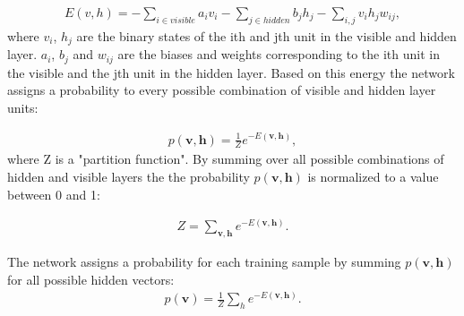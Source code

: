\begin{equation}
\begin{aligned}
    E(v,h) = -\sum_{i \in visible} a_{i}v_{i}-\sum_{j \in hidden} b_{j}h_{j}-\sum_{i,j} v_{i}h_{j}w_{ij},
\end{aligned}
\end{equation}
where $v_{i}$, $h_{j}$ are the binary states of the ith and jth unit in the visible and hidden layer. $a_{i}$, $b_{j}$ and $w_{ij}$ are the biases and weights corresponding to the ith unit in the visible and the jth unit in the hidden layer. Based on this energy the network assigns a probability to every possible combination of visible and hidden layer units:

\begin{equation}
\begin{aligned}
    p(\mathbf{v,h}) = \frac{1}{Z} e^{-E(\mathbf{v,h})},
\end{aligned}
\end{equation}
where Z is a "partition function". By summing over all possible combinations of hidden and visible layers the the probability $p(\mathbf{v,h})$ is normalized to a value between 0 and 1:

\begin{equation}
\begin{aligned}
    Z = \sum_{\mathbf{v,h}}e^{-E(\mathbf{v,h})}.
\end{aligned}
\end{equation}

The network assigns a probability for each training sample by summing $p(\mathbf{v,h})$ for all possible hidden vectors:
\begin{equation}
\begin{aligned}
    p(\mathbf{v}) = \frac{1}{Z} \sum_{h} e^{-E(\mathbf{v,h})}.
    \label{eq:prob_visible_layer}
\end{aligned}
\end{equation}

